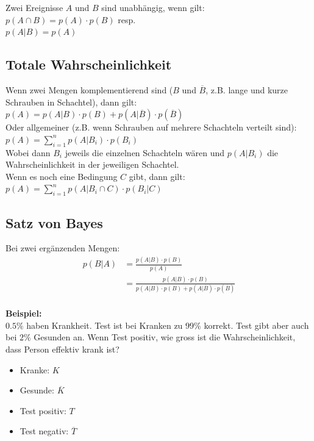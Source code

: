 \documentclass[12pt]{scrartcl}
\begin{document}
Zwei Ereignisse $A$ und $B$ sind unabhängig, wenn gilt:\\
$p(A \cap B) = p(A) \cdot p(B)$ resp.\\
$p(A|B) = p(A)$\\


\newpage
\subsection{Totale Wahrscheinlichkeit}
Wenn zwei Mengen komplementierend sind ($B$ und $\overline{B}$, z.B. lange und kurze Schrauben in Schachtel), 
dann gilt:\\
$p(A) = p(A|B) \cdot p(B) + p(A|\overline{B}) \cdot p(\overline{B})$\\

Oder allgemeiner (z.B. wenn Schrauben auf mehrere Schachteln verteilt sind):\\

$\displaystyle{p(A) = \sum_{i=1}^{n} p(A|B_i) \cdot p(B_i)}$\\

Wobei dann $B_i$ jeweils die einzelnen Schachteln wären und $p(A|B_i)$ die Wahrscheinlichkeit in der 
jeweiligen Schachtel.\\

Wenn es noch eine Bedingung $C$ gibt, dann gilt:\\
$\displaystyle{p(A) = \sum_{i=1}^{n} p(A|B_i \cap C) \cdot p(B_i|C)}$\\


\newpage
\subsection{Satz von Bayes}
Bei zwei ergänzenden Mengen:\\
\begin{align*}
    p(B|A)  &= \frac{p(A|B) \cdot p(B)}{p(A)} \\
            &= \frac{p(A|B) \cdot p(B)}{p(A|B) \cdot p(B) + p(A|\overline{B}) \cdot p(\overline{B})}\\
\end{align*}

\textbf{Beispiel:}\\
$0.5\%$ haben Krankheit. Test ist bei Kranken zu $99\%$ korrekt. Test gibt
aber auch bei $2\%$ Gesunden an. Wenn Test positiv, wie gross ist die Wahrscheinlichkeit,
dass Person effektiv krank ist?

\begin{itemize}
    \item Kranke: $K$
    \item Gesunde: $\overline{K}$
    \item Test positiv: $T$
    \item Test negativ: $\overline{T}$
\end{itemize}
\end{document}
